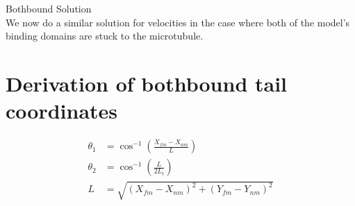 \documentclass[11pt, landscape]{article}
\begin{document}
\clearpage
{\huge Bothbound Solution} \\
We now do a similar solution for velocities in the case where both of the model's binding domains are stuck to the microtubule.


\section{Derivation of bothbound tail coordinates}

\begin{align*}
  \theta_1 &= \cos^{-1}\left(\frac{X_{fm}-X_{nm}}{L}\right)\\
  \theta_2 &= \cos^{-1}\left(\frac{L}{2L_t}\right)\\
  L &= \sqrt{(X_{fm}-X_{nm})^2+(Y_{fm}-Y_{nm})^2}\\
\end{align*}
\end{document}
